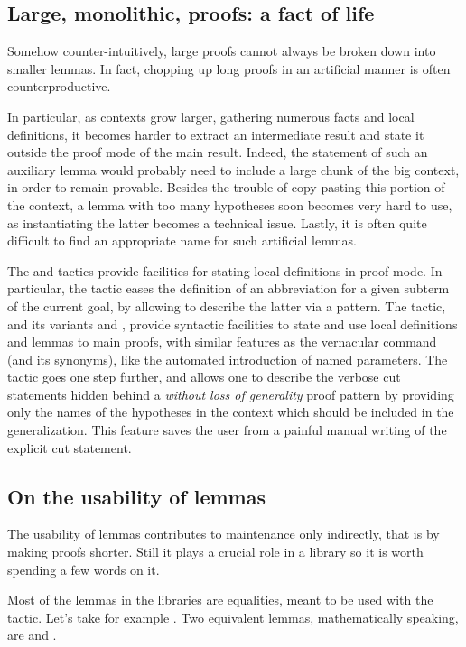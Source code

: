 \subsection{Large, monolithic, proofs: a fact of life}

Somehow counter-intuitively, large proofs cannot always be broken down
into smaller lemmas. In fact, chopping up long proofs in an
artificial manner is often counterproductive.

In particular, as contexts grow larger, gathering numerous facts and
local definitions, it becomes harder to extract an intermediate result
and state it outside the proof mode of the main result. Indeed, the
statement of such an auxiliary lemma would probably need to include a
large chunk of the big context, in order to remain provable. Besides
the trouble of copy-pasting this portion of the context, a lemma with
too many hypotheses soon becomes very hard to use, as instantiating
the latter becomes a technical issue. Lastly, it is often quite
difficult to find an appropriate name for such artificial lemmas.

The  and  tactics provide facilities for stating local
definitions in proof mode. In particular, the  tactic eases the
definition of an abbreviation for a given subterm of the current goal,
by allowing to describe the latter via a pattern. 
The  tactic, and its variants  and ,
provide syntactic facilities to state and use local definitions and
lemmas to main proofs, with similar features as the 
vernacular command (and its synonyms), like the automated introduction
of named parameters. The  tactic goes one step further, and
allows one to describe the verbose cut statements hidden behind a
\emph{without loss of generality} proof pattern by providing only the
names of the hypotheses in the context which should be included in the
generalization. This feature saves the user from a painful manual
writing of the explicit cut statement.

\subsection{On the usability of lemmas}

The usability of lemmas contributes to maintenance only indirectly,
that is by making proofs shorter. Still it plays a crucial role
in a library so it is worth spending a few words on it.

Most of the lemmas in the \mcbMC{} libraries are equalities, meant to be
used with the  tactic. Let's take for example . Two equivalent lemmas, mathematically speaking, are
and 
.

